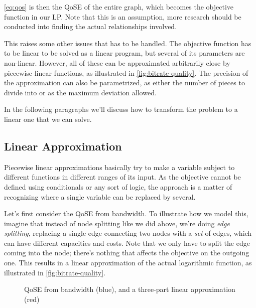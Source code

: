 \autoref{eq:qos} is then the QoSE of the entire graph, which becomes the objective function in our LP. Note that this is an assumption, more research should be conducted into finding the actual relationships involved.

This raises some other issues that has to be handled. The objective function has to be linear to be solved as a linear program, but several of its parameters are non-linear. However, all of these can be approximated arbitrarily close by piecewise linear functions, as illustrated in \autoref{fig:bitrate-quality}. The precision of the approximation can also be parametrized, as either the number of pieces to divide into or as the maximum deviation allowed.

In the following paragraphs we'll discuss how to transform the problem to a linear one that we can solve.


\subsection{Linear Approximation}

Piecewise linear approximations basically try to make a variable subject to different functions in different ranges of its input. As the objective cannot be defined using conditionals or any sort of logic, the approach is a matter of recognizing where a single variable can be replaced by several.

Let's first consider the QoSE from bandwidth. To illustrate how we model this, imagine that instead of node splitting like we did above, we're doing \emph{edge splitting}, replacing a single edge connecting two nodes with a \emph{set} of edges, which can have different capacities and costs. Note that we only have to split the edge coming into the node; there's nothing that affects the objective on the outgoing one. This results in a linear approximation of the actual logarithmic function, as illustrated in \autoref{fig:bitrate-quality}.

\begin{figure}
    \centering


    \caption{QoSE from bandwidth (blue), and a three-part linear approximation (red)}
    \label{fig:bitrate-quality}
\end{figure}

